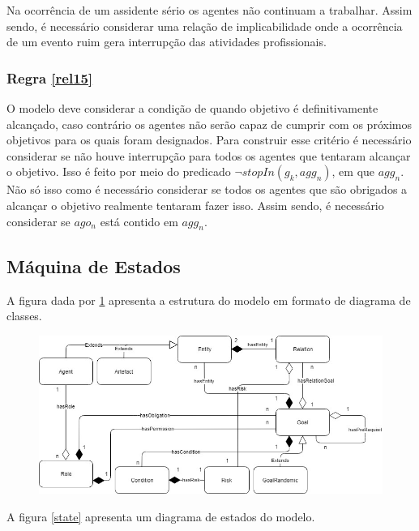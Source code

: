 \documentclass[12pt]{article}
\begin{document}
Na ocorrência de um assidente sério os agentes não continuam a trabalhar. Assim sendo, é necessário considerar uma relação de implicabilidade onde a ocorrência de um evento ruim gera interrupção das atividades profissionais. 

\subsubsection{Regra \ref{rel15}}

O modelo deve considerar a condição de quando objetivo é definitivamente alcançado, caso contrário os agentes não serão capaz de cumprir com os próximos objetivos para os quais foram designados. Para construir esse critério é necessário considerar se não houve interrupção para todos os agentes que tentaram alcançar o objetivo. Isso é feito por meio do predicado $\neg stopIn(g_k,agg_n)$, em que $agg_n$. Não só isso como é necessário considerar se todos os agentes que são obrigados a alcançar o objetivo realmente tentaram fazer isso. Assim sendo, é necessário considerar se $ago_n$ está contido em $agg_n$.   

\subsection{Máquina de Estados}

A figura dada por \ref{uml} apresenta a estrutura do modelo em formato de diagrama de classes.

\begin{figure}[H]
  \centering
  \includegraphics[width=1\linewidth]{uml20} 
  \caption{}
  \label{uml}
\end{figure}

A figura \ref{state} apresenta um diagrama de estados do modelo. 
\end{document}
